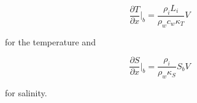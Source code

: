 \documentclass[11pt,a4paper]{article}
\begin{document}
	\begin{equation}
		\label{eq:eq10}
		\dfrac{\partial T}{\partial x}\bigg|_b = \dfrac{\rho_iL_i}{\rho_wc_w\kappa_T}V
	\end{equation}
	
	\noindent for the temperature and 
	
	\begin{equation}
		\label{eq:eq11}
		\dfrac{\partial S}{\partial x}\bigg|_b = \dfrac{\rho_i}{\rho_w\kappa_S}S_bV
	\end{equation}
	
	\noindent for salinity.
	
	

\end{document}
